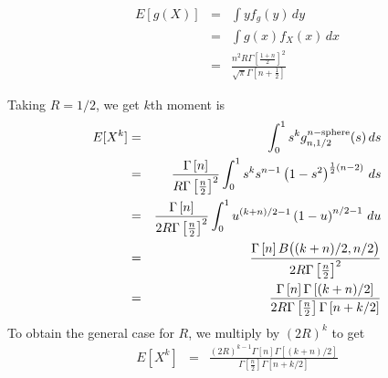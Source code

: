 \begin{eqnarray}
 E[ g(X) ] & = & \int y f_g (y) \, dy  \nonumber \\
           & = & \int g(x) f_X(x) \, dx  \nonumber \\
           & = &  \frac{n^{2}  R  {\Gamma\left[ \frac{1 + n}{2} \right]}^{2} }{ \sqrt{\pi} \Gamma\left[ n + \frac{1}{2} \right]  }            
\end{eqnarray}


Taking $R=1/2$, we get $k$th moment is
\begin{eqnarray}
E[ X^k ] 
    & = & \int_0^1 s^k g^{n-{\rm sphere}}_{n,1/2}(s) \, ds \nonumber \\
    & = & \frac{\Gamma\left[n\right]}{R \Gamma\left[\frac{n}{2}\right]^2} 
          \int_0^1 s^k s^{n-1}  \left(1 - s^2\right)^{\frac{1}{2} (n-2)}
               \, ds \nonumber \\
    & = & \frac{\Gamma\left[n\right]}{2 R \Gamma\left[\frac{n}{2}\right]^2} 
          \int_0^1 u^{(k+n)/2-1}  \left(1 - u \right)^{n/2-1}
               \, du \nonumber \\
    & = & \frac{\Gamma\left[n\right] B\big( (k+n)/2,n/2 \big)}
               {2 R \Gamma\left[\frac{n}{2}\right]^2}  \nonumber \\
    & = & \frac{\Gamma\left[ n \right] \Gamma\left[ (k+n)/2 \right]}
               {2 R \Gamma\left[\frac{n}{2}\right] \Gamma\left[ n+k/2 \right] } 
          \nonumber 
\end{eqnarray}
To obtain the general case for $R$, we multiply by $(2R)^k$ to get
\begin{eqnarray}
E[ X^k ] 
    & = & \frac{(2R)^{k-1} \Gamma\left[ n \right] \Gamma\left[ (k+n)/2 \right]}
               {\Gamma\left[\frac{n}{2}\right] \Gamma\left[ n+k/2 \right] } 
\end{eqnarray}
